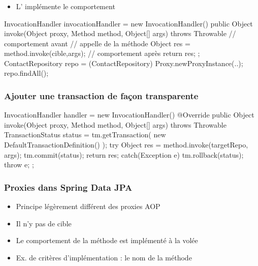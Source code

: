 \begin{frame}[fragile]
 \frametitle{}
 \begin{itemize}
  \item L' implémente le comportement
 \end{itemize}

\begin{javacode}
InvocationHandler invocationHandler = new InvocationHandler() {      
  public Object invoke(Object proxy, Method method, Object[] args)
                                throws Throwable {
    // comportement avant
    // appelle de la m\'ethode
    Object res = method.invoke(cible,args);
    // comportement apr\`es
    return res;
  }
};
ContactRepository repo = (ContactRepository) Proxy.newProxyInstance(..);
repo.findAll(); 
\end{javacode}

\end{frame}

\begin{frame}[fragile]
 \frametitle{Ajouter une transaction de façon transparente}

\begin{javacode}
InvocationHandler handler = new InvocationHandler() {
  @Override
  public Object invoke(Object proxy, Method method, Object[] args)
                   throws Throwable {
    TransactionStatus status = tm.getTransaction(
      new DefaultTransactionDefinition()
    );
    try {
      Object res = method.invoke(targetRepo, args);
      tm.commit(status);
      return res;
    } catch(Exception e) {
      tm.rollback(status);
      throw e;
    }
  }
};
\end{javacode}

\end{frame}

\begin{frame}
 \frametitle{Proxies dans Spring Data JPA}
 \begin{itemize}
  \item Principe légèrement différent des proxies AOP
  \item Il n'y pas de cible
  \item Le comportement de la méthode est implémenté à la volée
  \item Ex. de critères d'implémentation : le nom de la méthode
 \end{itemize}

\end{frame}

